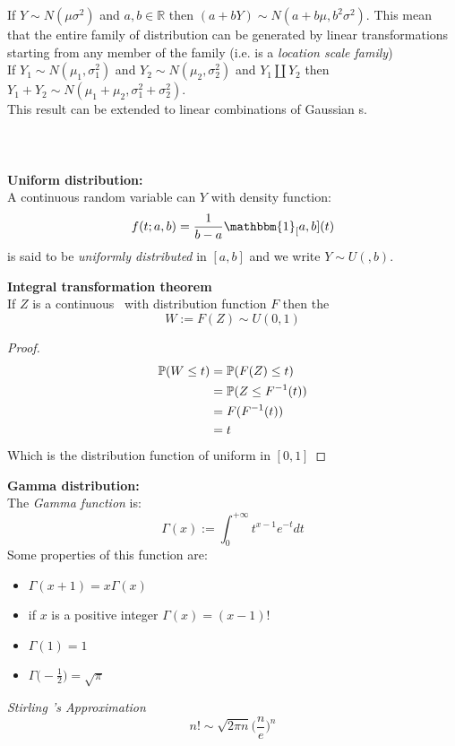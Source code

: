If $Y\sim N(\mu \sigma ^2)$ and $a,b \in \mathbb{R}$ then $(a+bY) \sim N (a+b\mu, b^2 \sigma ^2)$. This mean that the entire family of distribution can be generated by linear transformations starting from any member of the family (i.e. is a \textit{location scale family})\\


If $Y_1 \sim N( \mu_1 , \sigma_1^2)$ and $Y_2 \sim N( \mu_2 , \sigma_2^2)$ and $ Y_1 \amalg Y_2$ then $Y_1+Y_2 \sim N (\mu _1 + \mu_2 , \sigma_1^2 + \sigma_2^2)$.\\
This result can be extended to linear combinations of Gaussian \rv s.\\
\\
\\
\\
\textbf{Uniform distribution:}\\
A continuous random variable can $Y$ with density function:
$$f(t;a,b)=\frac{1}{b-a} \mathbbm{1}_[a,b](t)$$
is said to be \textit{uniformly distributed} in $[a,b]$ and we write $Y\sim U(,b)$.\\
\begin{teo}\textbf{Integral transformation theorem}\\
If $Z$ is a continuous \rv \  with distribution function $F$ then the \rv 
$$W:=F(Z) \sim U(0,1)$$
\end{teo}
\begin{proof}
	\[
	\begin{split}
	\mathbb{P}(W\leq t)
	&=\mathbb{P} (F(Z)\leq t)\\
	&=\mathbb{P} (Z\leq F^{-1}(t))\\
	&=F(F^{-1}(t))\\
	&=t
	\end{split}
	\]
	Which is the distribution function of uniform in $[0,1]$
	
\end{proof}
\textbf{Gamma distribution:}\\
The \textit{Gamma function} is:
$$\Gamma (x):= \int_{0}^{+ \infty}t^{x-1}e^{-t}dt$$
Some properties of this function are:
\begin{itemize}
	\item $\Gamma (x+1)= x \Gamma(x)$
	\item if $x$ is a positive integer $\Gamma(x)=(x-1)!$
	\item $\Gamma(1)=1$
	\item $\Gamma \bigg( -\frac{1}{2} \bigg)=\sqrt{\pi}$
\end{itemize}
\textit{Stirling	's Approximation}
$$n!\sim \sqrt{2\pi n}\bigg(\frac{n}{e} \bigg)^n$$

